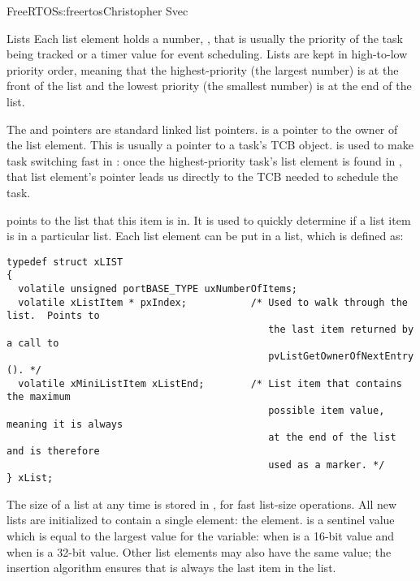 \begin{aosachapter}{FreeRTOS}{s:freertos}{Christopher Svec}
\begin{aosasect1}{Lists}
Each list element holds a number, , that is
usually the priority of the task being tracked or a timer value for
event scheduling.  Lists are kept in high-to-low priority order,
meaning that the highest-priority  (the largest number) is
at the front of the list and the lowest priority  (the
smallest number) is at the end of the list.

The  and  pointers are standard linked
list pointers.   is a pointer to the owner of the list element. This is
usually a pointer to a task's TCB object.  is used to
make task switching fast in : once the
highest-priority task's list element is found in
, that list element's  pointer
leads us directly to the TCB needed to schedule the task.

 points to the list that this item is in. It is used
to quickly determine if a list item is in a particular list.  Each
list element can be put in a list, which is defined as:

\begin{verbatim}
typedef struct xLIST
{
  volatile unsigned portBASE_TYPE uxNumberOfItems;
  volatile xListItem * pxIndex;           /* Used to walk through the list.  Points to
                                             the last item returned by a call to 
                                             pvListGetOwnerOfNextEntry (). */
  volatile xMiniListItem xListEnd;        /* List item that contains the maximum 
                                             possible item value, meaning it is always
                                             at the end of the list and is therefore 
                                             used as a marker. */
} xList;
\end{verbatim}

The size of a list at any time is stored in , for
fast list-size operations.
All new lists are initialized to contain a single element: the
 element.   is a sentinel
value which is equal to the largest value for the 
variable:  when  is a 16-bit value and
 when  is a 32-bit value. Other list
elements may also have the same value; the insertion algorithm ensures
that  is always the last item in the list.
 

\end{aosasect1}
\end{aosachapter}
